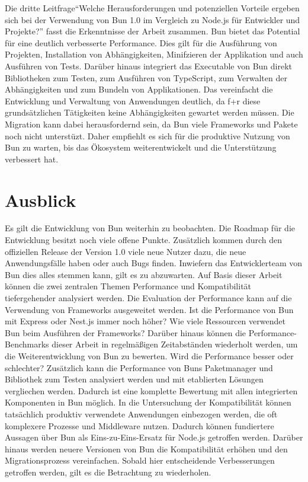 \noindent
Die dritte Leitfrage``Welche Herausforderungen und potenziellen Vorteile ergeben sich bei der Verwendung von Bun 1.0 im Vergleich zu Node.js für Entwickler und Projekte?'' fasst die Erkenntnisse der Arbeit zusammen. Bun bietet das Potential für eine deutlich verbesserte Performance. Dies gilt für die Ausführung von Projekten, Installation von Abhängigkeiten, Minifzieren der Applikation und auch Ausführen von Tests. Darüber hinaus integriert das Executable von Bun direkt Bibliotheken zum Testen, zum Ausführen von TypeScript, zum Verwalten der Abhängigkeiten und zum Bundeln von Applikationen. Das vereinfacht die Entwicklung und Verwaltung von Anwendungen deutlich, da f+r diese grundsätzlichen Tätigkeiten keine Abhängigkeiten gewartet werden müssen. Die Migration kann dabei herausfordernd sein, da Bun viele Frameworks und Pakete noch nicht unterstüzt. Daher empfiehlt es sich für die produktive Nutzung von Bun zu warten, bis das Ökosystem weiterentwickelt und die Unterstützung verbessert hat.


\section{Ausblick} \label{sec:finalThoughts-outlook}
Es gilt die Entwicklung von Bun weiterhin zu beobachten. Die Roadmap für die Entwicklung besitzt noch viele offene Punkte. Zusätzlich kommen durch den offiziellen Release der Version 1.0 viele neue Nutzer dazu, die neue Anwendungsfälle haben oder auch Bugs finden. Inwiefern das Entwicklerteam von Bun dies alles stemmen kann, gilt es zu abzuwarten. \newline
Auf Basis dieser Arbeit können die zwei zentralen Themen Performance und Kompatibilität tiefergehender analysiert werden. Die Evaluation der Performance kann auf die Verwendung von Frameworks ausgeweitet werden. Ist die Performance von Bun mit Express oder Nest.js immer noch höher? Wie viele Ressourcen verwendet Bun beim Ausführen der Frameworks? Darüber hinaus können die Performance-Benchmarks dieser Arbeit in regelmäßigen Zeitabständen wiederholt werden, um die Weiterentwicklung von Bun zu bewerten. Wird die Performance besser oder schlechter?
Zusätzlich kann die Performance von Buns Paketmanager und Bibliothek zum Testen analysiert werden und mit etablierten Lösungen vergliechen werden. Dadurch ist eine komplette Bewertung mit allen integrierten Komponenten in Bun möglich. \newline
In die Untersuchung der Kompatibilität können tatsächlich produktiv verwendete Anwendungen einbezogen werden, die oft komplexere Prozesse und Middleware nutzen. Dadurch können fundiertere Aussagen über Bun als Eins-zu-Eins-Ersatz für Node.js getroffen werden. Darüber hinaus werden neuere Versionen von Bun die Kompatibilität erhöhen und den Migrationsprozess vereinfachen. Sobald hier entscheidende Verbesserungen getroffen werden, gilt es die Betrachtung zu wiederholen.
